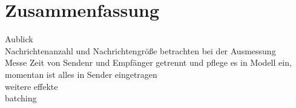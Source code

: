 
\chapter{Zusammenfassung}
\label{ch:zusammenfassung}
Aublick\\
Nachrichtenanzahl und Nachrichtengröße betrachten bei der Ausmessung \\
Messe Zeit von Sendenr und Empfänger getrennt und pflege es in Modell ein, momentan ist alles in Sender eingetragen \\
weitere effekte \\
batching

